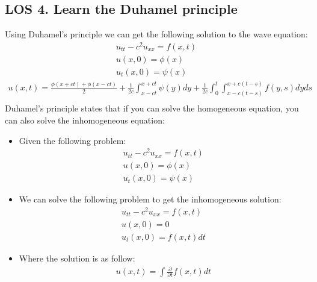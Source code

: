 \documentclass[12pt, a4paper]{article}
\begin{document}
\subsection*{LOS 4. Learn the Duhamel principle}
Using Duhamel's principle we can get the following solution to the wave equation:
\begin{gather*}
    u_{tt} - c^2u_{xx} = f(x,t) \\
    u(x, 0) = \phi(x)\\
    u_t(x,0) = \psi(x)
\end{gather*}
\begin{gather*}
    u(x, t) = \frac{\phi(x+ct) + \phi(x-ct)}{2} + \frac{1}{2c} \int_{x-ct}^{x+ct}\psi(y)dy + \frac{1}{2c} \int_0^t\int_{x-c(t-s)}^{x+c(t-s)}f(y, s)dyds\\
\end{gather*}
Duhamel's principle states that if you can solve the homogeneous equation, you can also solve the inhomogeneous equation:
\begin{itemize}
    \item Given the following problem:
    \begin{gather*}
        u_{tt} - c^2u_{xx} = f(x,t) \\
        u(x, 0) = \phi(x)\\
        u_t(x,0) = \psi(x)
    \end{gather*}
    \item We can solve the following problem to get the inhomogeneous solution:
    \begin{gather*}
        u_{tt} - c^2u_{xx} = f(x,t) \\
        u(x, 0) = 0\\
        u_t(x,0) = f(x, t)dt
    \end{gather*}
    \item Where the solution is as follow:
    \begin{gather*}
        u(x, t) = \int \frac{\partial}{\partial t} f(x, t)dt
    \end{gather*}
\end{itemize}





\vspace{0.3em}
\end{document}
